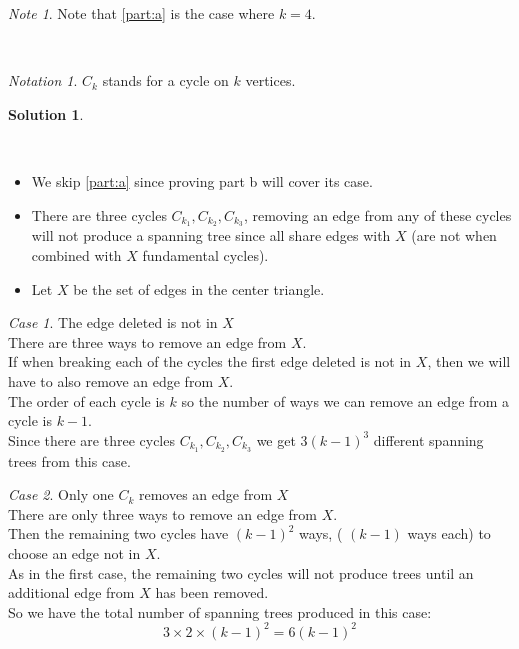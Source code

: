 \documentclass[10pt]{article}
\theoremstyle{plain}
\theoremstyle{definition}
\newtheorem*{sol}{Solution}
\theoremstyle{remark}
\newtheorem*{nt}{Note}
\newtheorem*{nota}{Notation}
\newtheorem*{case}{Case}
\begin{document}
\smallskip

\begin{nt}
\indent Note that \ref{part:a} is the case where $k = 4$.
\end{nt}
\\
\begin{nota}
\indent $C_k$ stands for a cycle on $k$ vertices.
\end{nota}

\medskip

\begin{sol}
\end{sol}

\\

\begin{itemize}
\item We skip \ref{part:a} since proving part b will cover its case.
\item There are three cycles $C_{k_{1}}, C_{k_{2}}, C_{k_{3}}$, removing an edge from any of these cycles will not produce a spanning tree since all share edges with $X$ (are not when combined with $X$ fundamental cycles).
\item Let $X$ be the set of edges in the center triangle.
\end{itemize}

\smallskip

\begin{case}{The edge deleted is not in $X$} \label{case:4} \\
There are three ways to remove an edge from $X$. \\
If when breaking each of the cycles the first edge deleted is not in $X$, then we will have to also remove an edge from $X$. \\
The order of each cycle is $k$ so the number of ways we can remove an edge from a cycle is $k - 1$. \\
Since there are three cycles $C_{k_{1}}, C_{k_{2}}, C_{k_{3}}$ we get $3(k - 1)^3$ different spanning trees from this case. \\
\end{case}

\smallskip

\begin{case}{Only one $C_k$ removes an edge from $X$} \label{case:5} \\
There are only three ways to remove an edge from $X$. \\
Then the remaining two cycles have $(k - 1)^2$ ways, ( $(k-1)$ ways each) to choose an edge not in $X$. \\
As in the first case, the remaining two cycles will not produce trees until an additional edge from $X$ has been removed. \\
So we have the total number of spanning trees produced in this case:
\[ 3 \times 2 \times (k - 1)^2 = 6(k -1)^2 \]
\end{case}
\end{document}
